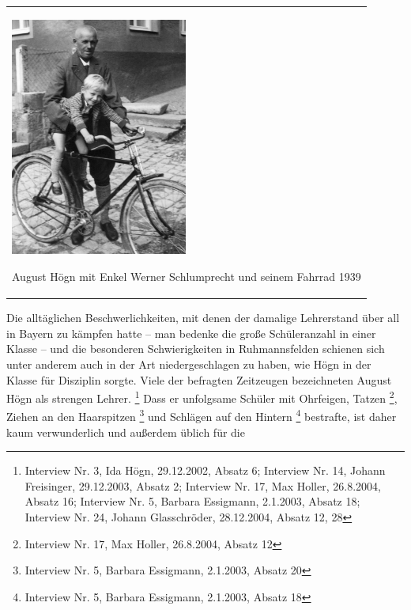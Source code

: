\begin{center}
\begin{minipage}{6.202cm}
\begin{center}
\tablefirsthead{}
\tablehead{}
\tabletail{}
\tablelasttail{}
\begin{supertabular}{m{6.0020003cm}}

\includegraphics[width=5.821cm,height=7.851cm]{pictures/zulassungsarbeit-img032.jpg}

August Högn mit Enkel Werner
Schlumprecht und seinem Fahrrad 1939\\
\end{supertabular}
\end{center}
\end{minipage}
\end{center}
Die alltäglichen Beschwerlichkeiten, mit denen der damalige Lehrerstand
über all in Bayern zu kämpfen hatte – man bedenke die große
Schüleranzahl in einer Klasse – und die besonderen Schwierigkeiten in
Ruhmannsfelden schienen sich unter anderem auch in der Art
niedergeschlagen zu haben, wie Högn in der Klasse für Disziplin sorgte.
Viele der befragten Zeitzeugen bezeichneten August Högn als strengen
Lehrer. \footnote{Interview Nr. 3, Ida Högn,
29.12.2002, Absatz 6; Interview Nr. 14, Johann Freisinger, 29.12.2003,
Absatz 2; Interview Nr. 17, Max Holler, 26.8.2004, Absatz 16; Interview
Nr. 5, Barbara Essigmann, 2.1.2003, Absatz 18; Interview Nr. 24, Johann
Glasschröder, 28.12.2004, Absatz 12, 28} Dass er unfolgsame Schüler
mit Ohrfeigen, Tatzen \footnote{Interview Nr. 17, Max Holler,
26.8.2004, Absatz 12}, Ziehen an den Haarspitzen \footnote{Interview
Nr. 5, Barbara Essigmann, 2.1.2003, Absatz 20} und Schlägen auf den
Hintern \footnote{Interview Nr. 5, Barbara Essigmann, 2.1.2003, Absatz
18} bestrafte, ist daher kaum verwunderlich und außerdem üblich für die
